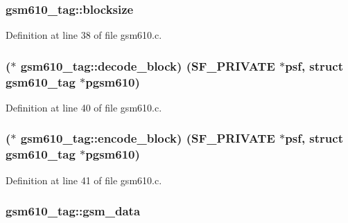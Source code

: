 \subsubsection[{\texorpdfstring{blocksize}{blocksize}}]{ gsm610\+\_\+tag\+::blocksize}\hypertarget{structgsm610__tag_a9d52f00652438a47d5b1d77895ce529d}{}\label{structgsm610__tag_a9d52f00652438a47d5b1d77895ce529d}


Definition at line 38 of file gsm610.\+c.

\subsubsection[{\texorpdfstring{decode\+\_\+block}{decode_block}}]{($\ast$ gsm610\+\_\+tag\+::decode\+\_\+block) ({\bf S\+F\+\_\+\+P\+R\+I\+V\+A\+TE} $\ast$psf, struct {\bf gsm610\+\_\+tag} $\ast$pgsm610)}\hypertarget{structgsm610__tag_a6b3edf99f5287989e374cd9404803771}{}\label{structgsm610__tag_a6b3edf99f5287989e374cd9404803771}


Definition at line 40 of file gsm610.\+c.

\subsubsection[{\texorpdfstring{encode\+\_\+block}{encode_block}}]{($\ast$ gsm610\+\_\+tag\+::encode\+\_\+block) ({\bf S\+F\+\_\+\+P\+R\+I\+V\+A\+TE} $\ast$psf, struct {\bf gsm610\+\_\+tag} $\ast$pgsm610)}\hypertarget{structgsm610__tag_a87978f5ff126050e1525bfbb7eae78d9}{}\label{structgsm610__tag_a87978f5ff126050e1525bfbb7eae78d9}


Definition at line 41 of file gsm610.\+c.

\subsubsection[{\texorpdfstring{gsm\+\_\+data}{gsm_data}}]{ gsm610\+\_\+tag\+::gsm\+\_\+data}\hypertarget{structgsm610__tag_a1fe7dd70326992013b603767f3bb1bde}{}\label{structgsm610__tag_a1fe7dd70326992013b603767f3bb1bde}


